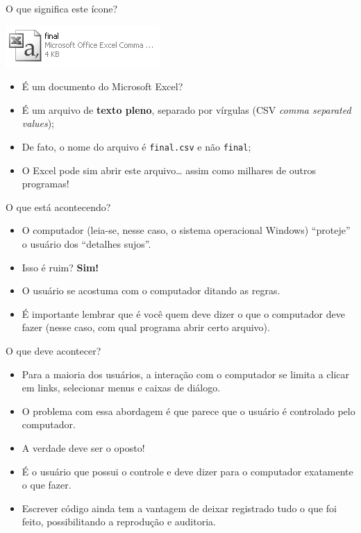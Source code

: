 \documentclass[
  10pt,
  a4paper]{book}
\providecommand{\tightlist}{%
  \setlength{\itemsep}{0pt}\setlength{\parskip}{0pt}}
\begin{document}
O que significa este ícone?

\begin{center}\includegraphics[width=0.5\linewidth]{img/excelcsvgrey} \end{center}

\begin{itemize}
\tightlist
\item
  É um documento do Microsoft Excel?
\item
  É um arquivo de \textbf{texto pleno}, separado por vírgulas (CSV \emph{comma
  separated values});
\item
  De fato, o nome do arquivo é \texttt{final.csv} e não \texttt{final};
\item
  O Excel pode sim abrir este arquivo\ldots{} assim como milhares de outros
  programas!
\end{itemize}

O que está acontecendo?

\begin{itemize}
\tightlist
\item
  O computador (leia-se, nesse caso, o sistema operacional Windows)
  ``proteje'' o usuário dos ``detalhes sujos''.
\item
  Isso é ruim? \textbf{Sim!}
\item
  O usuário se acostuma com o computador ditando as regras.
\item
  É importante lembrar que é você quem deve dizer o que o computador
  deve fazer (nesse caso, com qual programa abrir certo arquivo).
\end{itemize}

O que deve acontecer?

\begin{itemize}
\tightlist
\item
  Para a maioria dos usuários, a interação com o computador se limita a
  clicar em links, selecionar menus e caixas de diálogo.
\item
  O problema com essa abordagem é que parece que o usuário é controlado
  pelo computador.
\item
  A verdade deve ser o oposto!
\item
  É o usuário que possui o controle e deve dizer para o computador
  exatamente o que fazer.
\item
  Escrever código ainda tem a vantagem de deixar registrado tudo o que
  foi feito, possibilitando a reprodução e auditoria.
\end{itemize}
\end{document}
